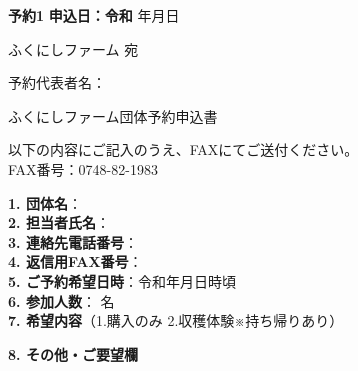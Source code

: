\documentclass[a4paper,11pt]{jlreq}
\begin{document}
\noindent
\textbf{予約1} \hfill \textbf{申込日：令和} \underline{\hspace{1cm}}年\underline{\hspace{1cm}}月\underline{\hspace{1cm}}日\\

\vspace{2em}

\noindent
ふくにしファーム 宛

\vspace{2em}

\begin{flushright}
予約代表者名：\underline{\hspace{5cm}}\\
\end{flushright}

\vspace{3em}

\begin{center}
{\LARGE ふくにしファーム団体予約申込書}
\end{center}

\vspace{3em}

\noindent
以下の内容にご記入のうえ、FAXにてご送付ください。\\
FAX番号：0748-82-1983

\vspace{1em}

\noindent
\textbf{1. 団体名}：\underline{\hspace{11cm}}\\

\noindent
\textbf{2. 担当者氏名}：\underline{\hspace{10cm}}\\

\noindent
\textbf{3. 連絡先電話番号}：\underline{\hspace{10cm}}\\

\noindent
\textbf{4. 返信用FAX番号}：\underline{\hspace{10cm}}\\

\noindent
\textbf{5. ご予約希望日時}：令和\underline{\hspace{1cm}}年\underline{\hspace{1cm}}月\underline{\hspace{1cm}}日\underline{\hspace{1cm}}時頃\\

\noindent
\textbf{6. 参加人数}：\underline{\hspace{3cm}} 名\\[0.5em]

\noindent
\textbf{7. 希望内容}（1.購入のみ    2.収穫体験※持ち帰りあり）\underline{\hspace{3cm}}\\


\vspace{1em}

\noindent
\textbf{8. その他・ご要望欄}\\
\fbox{
  \parbox[t][5em][t]{\textwidth}{\strut\vspace{3em}}%
}
\end{document}
